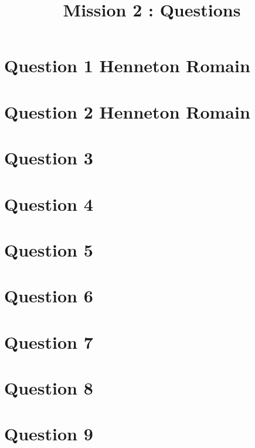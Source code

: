 \documentclass{article}
\begin{document}
\title{Mission 2 : Questions}
\maketitle
\section*{Question 1 Henneton Romain}
\section*{Question 2 Henneton Romain}
\section*{Question 3}
\section*{Question 4}
\section*{Question 5}
\section*{Question 6}
\section*{Question 7}
\section*{Question 8}
\section*{Question 9}
\end{document}
